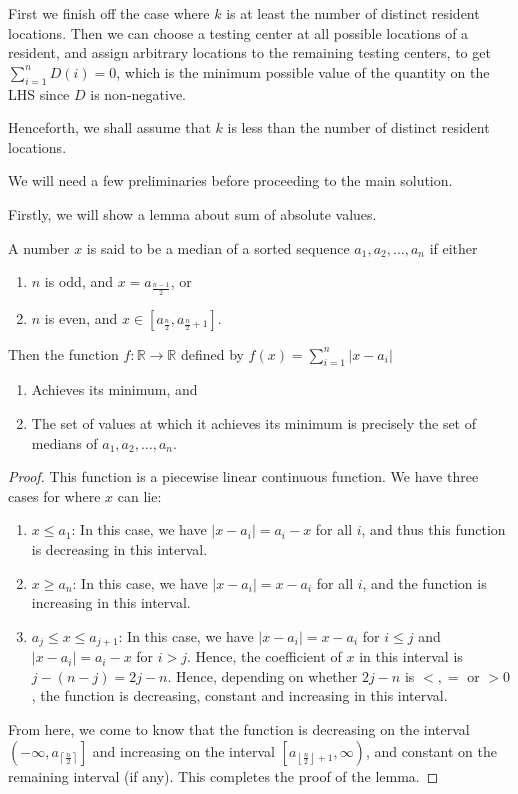 First we finish off the case where $k$ is at least the number of distinct resident locations. Then we can choose a testing center at all possible locations of a resident, and assign arbitrary locations to the remaining testing centers, to get $\sum_{i = 1}^n D(i) = 0$, which is the minimum possible value of the quantity on the LHS since $D$ is non-negative.

Henceforth, we shall assume that $k$ is less than the number of distinct resident locations.

We will need a few preliminaries before proceeding to the main solution.

Firstly, we will show a lemma about sum of absolute values.

\begin{lemma}
    A number $x$ is said to be a median of a sorted sequence $a_1, a_2, \ldots, a_n$ if either
    \begin{enumerate}
        \item $n$ is odd, and $x = a_{\frac{n - 1}{2}}$, or
        \item $n$ is even, and $x \in \left[a_{\frac{n}{2}}, a_{\frac{n}{2} + 1}\right]$.
    \end{enumerate}
    Then the function $f : \mathbb{R} \to \mathbb{R}$ defined by $f(x) = \sum_{i = 1}^n |x - a_i|$ 
    \begin{enumerate}
        \item Achieves its minimum, and
        \item The set of values at which it achieves its minimum is precisely the set of medians of $a_1, a_2, \ldots, a_n$.
    \end{enumerate}
\end{lemma}
\begin{proof}
    This function is a piecewise linear continuous function. We have three cases for where $x$ can lie:
    \begin{enumerate}
        \item $x \le a_1$: In this case, we have $|x - a_i| = a_i - x$ for all $i$, and thus this function is decreasing in this interval.
        \item $x \ge a_n$: In this case, we have $|x - a_i| = x - a_i$ for all $i$, and the function is increasing in this interval.
        \item $a_j \le x \le a_{j + 1}$: In this case, we have $|x - a_i| = x - a_i$ for $i \le j$ and $|x - a_i| = a_i - x$ for $i > j$. Hence, the coefficient of $x$ in this interval is $j - (n -
            j) = 2j - n$. Hence, depending on whether $2j - n$ is $<, =$ or $> 0$, the function is decreasing, constant and increasing in this interval.
    \end{enumerate}

    From here, we come to know that the function is decreasing on the interval $\left(-\infty, a_{\left\lceil\frac{n}{2}\right\rceil}\right]$ and increasing on the interval
    $\left[a_{\left\lfloor\frac{n}{2}\right\rfloor + 1}, \infty\right)$, and constant on the remaining interval (if any). This completes the proof of the lemma.
\end{proof}

